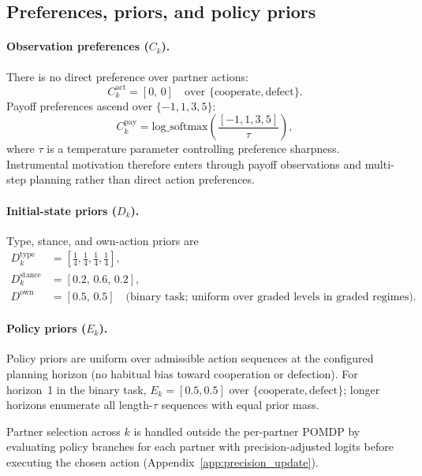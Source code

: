 \subsection{Preferences, priors, and policy priors}

\paragraph{Observation preferences ($C_k$).}
There is no direct preference over partner actions:
\begin{equation}
C_k^{\mathrm{act}} = [0,\,0] \quad \text{over } \{\mathrm{cooperate},\mathrm{defect}\}.
\label{eq:c_act}
\end{equation}
Payoff preferences ascend over $\{-1,1,3,5\}$:
\begin{equation}
C_k^{\mathrm{pay}} = \mathrm{log\_softmax}\!\left(\frac{[-1,1,3,5]}{\tau}\right),
\label{eq:c_pay}
\end{equation}
where $\tau$ is a temperature parameter controlling preference sharpness. Instrumental motivation therefore enters through payoff observations and multi-step planning rather than direct action preferences.

\paragraph{Initial-state priors ($D_k$).}
Type, stance, and own-action priors are
\begin{align}
D_k^{\mathrm{type}} &= \left[\tfrac{1}{4},\tfrac{1}{4},\tfrac{1}{4},\tfrac{1}{4}\right], \label{eq:d_type}\\
D_k^{\mathrm{stance}} &= [0.2,\,0.6,\,0.2], \label{eq:d_stance}\\
D^{\mathrm{own}} &= [0.5,\,0.5] \quad \text{(binary task; uniform over graded levels in graded regimes).} \label{eq:d_own}
\end{align}

\paragraph{Policy priors ($E_k$).}
Policy priors are uniform over admissible action sequences at the configured planning horizon (no habitual bias toward cooperation or defection). For horizon~1 in the binary task, $E_k=[0.5,0.5]$ over $\{\mathrm{cooperate},\mathrm{defect}\}$; longer horizons enumerate all length-$\tau$ sequences with equal prior mass.

Partner selection across $k$ is handled outside the per-partner POMDP by evaluating policy branches for each partner with precision-adjusted logits before executing the chosen action (Appendix~\ref{app:precision_update}).

